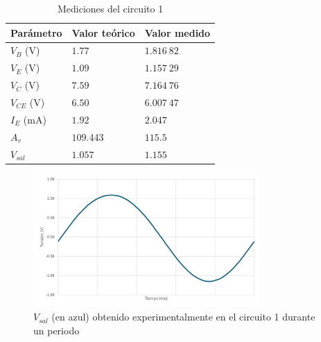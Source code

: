 \documentclass[journal]{IEEEtran}
\begin{document}
\begin{table}[H]
        \renewcommand{\arraystretch}{1.5}
        \caption{Mediciones del circuito 1}
        \centering
        \begin{tabular}{ >{\centering\arraybackslash}m{2.5cm} >{\centering\arraybackslash}m{2.5cm} >{\centering\arraybackslash}m{2.5cm} }
                \hline
            Parámetro & Valor teórico & Valor medido\\ 
            \hline
            $V_B$ ($\mathrm{V}$) & $1.77$  & $1.816~82$  \\ 
            $V_E$ ($\mathrm{V}$) & $1.09$  & $1.157~29$  \\
            $V_C$ ($\mathrm{V}$) & $7.59$  & $7.164~76$  \\
            $V_{CE}$ ($\mathrm{V}$) & $6.50$  & $6.007~47$  \\
            $I_E$ ($\mathrm{mA}$) & $1.92$  & $2.047$ \\ 
            $A_v$  & $109.443$ & $115.5$  \\
            $V_{sal}$ & $1.057$  & $1.155$ \\
            \hline
        \end{tabular}
        \label{tabla5}
    \end{table}

\begin{figure}[H]
        \centering
        \includegraphics[width=3.4in]{OutC1.png}
        \caption{$V_{sal}$ (en azul) obtenido experimentalmente en el circuito 1 durante un periodo}
        \label{fig:SignalExperimental_02}
\end{figure}
    
\end{document}
